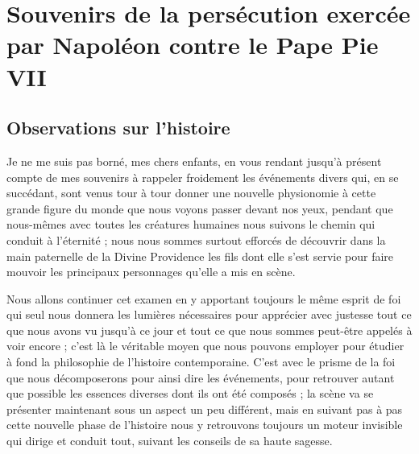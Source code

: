 \documentclass[11pt,a4paper]{report}
\begin{document}
\chapter{Souvenirs de la persécution exercée par Napoléon contre le Pape Pie VII}

\section*{Observations sur l'histoire}

Je ne me suis pas borné, mes chers enfants, en vous rendant jusqu'à présent compte de mes souvenirs à rappeler froidement les événements divers qui, en se succédant, sont venus tour à tour donner une nouvelle physionomie à cette grande figure du monde que nous voyons passer devant nos yeux, pendant que nous-mêmes avec toutes les créatures humaines nous suivons le chemin qui conduit à l'éternité ; nous nous sommes surtout efforcés de découvrir dans la main paternelle de la Divine Providence les fils dont elle s'est servie pour faire mouvoir les principaux personnages qu'elle a mis en scène.

Nous allons continuer cet examen en y apportant toujours le même esprit de foi qui seul nous donnera les lumières nécessaires pour apprécier avec justesse tout ce que nous avons vu jusqu'à ce jour et tout ce que nous sommes peut-être appelés à voir encore ; c'est là le véritable moyen que nous pouvons employer pour étudier à fond la philosophie de l'histoire contemporaine. C'est avec le prisme de la foi que nous décomposerons pour ainsi dire les événements, pour retrouver autant que possible les essences diverses dont ils ont été composés ; la scène va se présenter maintenant sous un aspect un peu différent, mais en suivant pas à pas cette nouvelle phase de l'histoire nous y retrouvons toujours un moteur invisible qui dirige et conduit tout, suivant les conseils de sa haute sagesse.
\end{document}
